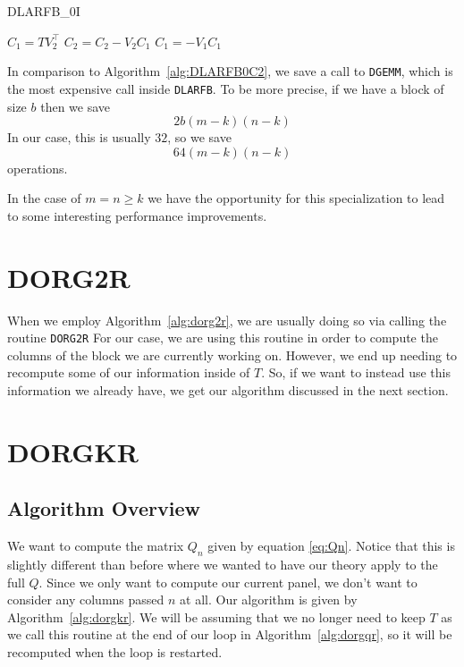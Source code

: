 \documentclass[12pt]{article}
\newcommand{\nb}{b}
\begin{document}
    \begin{algorithm}
        \caption{DLARFB\_0I}\label{alg:DLARFBInit}
        \begin{algorithmic}[1]
            \STATE $C_1 = TV_2^\top$
            \STATE $C_2 = C_2 - V_2C_1$
            \STATE $C_1 =     - V_1C_1$
        \end{algorithmic}
    \end{algorithm}
    
    In comparison to Algorithm~\ref{alg:DLARFB0C2}, we save a call to \verb|DGEMM|, which is the most expensive 
    call inside \verb|DLARFB|. To be more precise, if we have a block of size $\nb$ then we save
    \[
        2\nb\left(m-k\right)\left(n-k\right)
    \]
    In our case, this is usually $32$, so we save
    \[
        64\left(m-k\right)\left(n-k\right)
    \]
    operations. 

    In the case of $m=n\geq k$ we have the opportunity for this specialization to lead to some interesting
    performance improvements.
    \section{DORG2R}
    When we employ Algorithm~\ref{alg:dorg2r}, we are usually doing so via calling the routine \verb|DORG2R|
    For our case, we are using this routine in order to compute the columns of the block we are currently 
    working on. However, we end up needing to recompute some of our information inside of $T$. So, if we want to
    instead use this information we already have, we get our algorithm discussed in the next section.
    \section{DORGKR}
    \subsection{Algorithm Overview}
    We want to compute the matrix $Q_n$ given by equation \ref{eq:Qn}. Notice that this is slightly different than
    before where we wanted to have our theory apply to the full $Q$. Since we only want to compute our current
    panel, we don't want to consider any columns passed $n$ at all. Our algorithm is given by 
    Algorithm~\ref{alg:dorgkr}. We will be assuming that we no longer need to keep $T$ as we call this routine
    at the end of our loop in Algorithm~\ref{alg:dorgqr}, so it will be recomputed when the loop is restarted.
\end{document}
